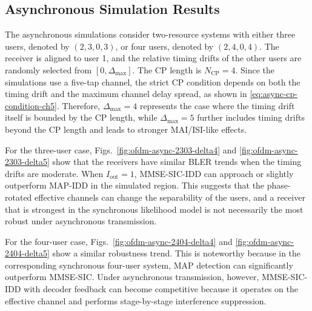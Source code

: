 \subsection{Asynchronous Simulation Results}

The asynchronous simulations consider two-resource systems with either three users, denoted by $(2,3,0,3)$, or four users, denoted by $(2,4,0,4)$. The receiver is aligned to user 1, and the relative timing drifts of the other users are randomly selected from $[0,\Delta_{\max}]$. The CP length is $N_{\mathrm{CP}}=4$. Since the simulations use a five-tap channel, the strict CP condition depends on both the timing drift and the maximum channel delay spread, as shown in \eqref{eq:async-cp-condition-ch5}. Therefore, $\Delta_{\max}=4$ represents the case where the timing drift itself is bounded by the CP length, while $\Delta_{\max}=5$ further includes timing drifts beyond the CP length and leads to stronger MAI/ISI-like effects.



For the three-user case, Figs.~\ref{fig:ofdm-async-2303-delta4} and \ref{fig:ofdm-async-2303-delta5} show that the receivers have similar BLER trends when the timing drifts are moderate. When $I_{\mathrm{out}}=1$, MMSE-SIC-IDD can approach or slightly outperform MAP-IDD in the simulated region. This suggests that the phase-rotated effective channels can change the separability of the users, and a receiver that is strongest in the synchronous likelihood model is not necessarily the most robust under asynchronous transmission.



For the four-user case, Figs.~\ref{fig:ofdm-async-2404-delta4} and \ref{fig:ofdm-async-2404-delta5} show a similar robustness trend. This is noteworthy because in the corresponding synchronous four-user system, MAP detection can significantly outperform MMSE-SIC. Under asynchronous transmission, however, MMSE-SIC-IDD with decoder feedback can become competitive because it operates on the effective channel and performs stage-by-stage interference suppression.


